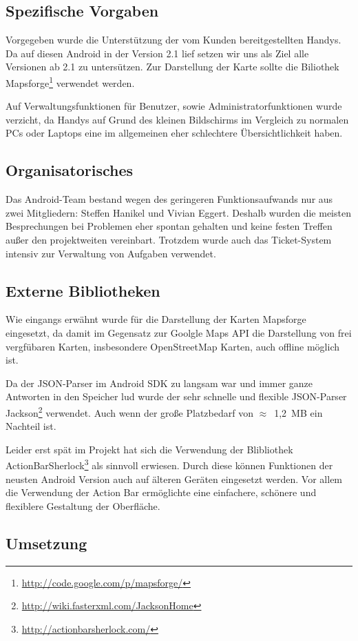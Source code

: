 \subsection*{Spezifische Vorgaben}
Vorgegeben wurde die Unterstützung der vom Kunden bereitgestellten Handys. Da auf diesen Android in der Version 2.1 lief setzen wir uns als Ziel alle Versionen ab 2.1 zu untersützen. Zur Darstellung der Karte sollte die Biliothek Mapsforge\footnote{\url{http://code.google.com/p/mapsforge/}} verwendet werden.

Auf Verwaltungsfunktionen für Benutzer, sowie Administratorfunktionen wurde verzicht, da Handys auf Grund des kleinen Bildschirms im Vergleich zu normalen PCs oder Laptops eine im allgemeinen eher schlechtere Übersichtlichkeit haben.

\subsection*{Organisatorisches}
Das Android-Team bestand wegen des geringeren Funktionsaufwands nur aus zwei Mitgliedern: Steffen Hanikel und Vivian Eggert. Deshalb wurden die meisten Besprechungen bei Problemen eher spontan gehalten und keine festen Treffen außer den projektweiten vereinbart. Trotzdem wurde auch das Ticket-System intensiv zur Verwaltung von Aufgaben verwendet.

\subsection*{Externe Bibliotheken}
Wie eingangs erwähnt wurde für die Darstellung der Karten Mapsforge eingesetzt, da damit im Gegensatz zur Goolgle Maps API die Darstellung von frei vergfübaren Karten, insbesondere OpenStreetMap Karten, auch offline möglich ist.

Da der JSON-Parser im Android SDK zu langsam war und immer ganze Antworten in den Speicher lud wurde der sehr schnelle und flexible JSON-Parser Jackson\footnote{\url{http://wiki.fasterxml.com/JacksonHome}} verwendet. Auch wenn der große Platzbedarf von $\approx$~1,2~MB ein Nachteil ist.

Leider erst spät im Projekt hat sich die Verwendung der Blibliothek ActionBarSherlock\footnote{\url{http://actionbarsherlock.com/}} als sinnvoll erwiesen. Durch diese können Funktionen der neusten Android Version auch auf älteren Geräten eingesetzt werden. Vor allem die Verwendung der Action Bar ermöglichte eine einfachere, schönere und flexiblere Gestaltung der Oberfläche.

\subsection*{Umsetzung}
